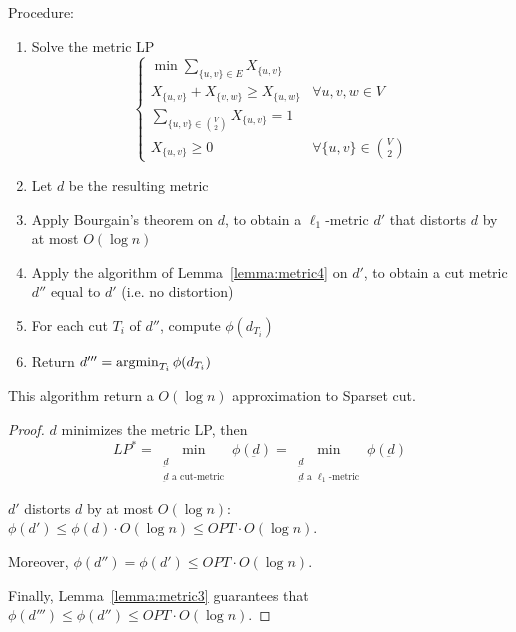     Procedure:
    \begin{enumerate}
        \item Solve the metric LP
        \begin{equation}
            \begin{cases}
                \min \sum_{\{u,v\} \in E} X_{\{u,v\}}\\
                X_{\{u,v\}} + X_{\{v,w\}} \geq X_{\{u,w\}}          & \forall u,v,w \in V\\
                \sum_{\{u,v\} \in \binom{V}{2}} X_{\{u,v\}} = 1\\
                X_{\{u,v\}} \geq 0                                  & \forall \{u,v\} \in \binom{V}{2}
            \end{cases}
        \end{equation}
        \item Let $d$ be the resulting metric
        \item Apply Bourgain's theorem on $d$, to obtain a $\ell_1$-metric $d'$ that distorts $d$ by at most $O(\log n)$
        \item Apply the algorithm of Lemma~\ref{lemma:metric4} on $d'$, to obtain a cut metric $d''$ equal to $d'$ (i.e. no distortion)
        \item For each cut $T_i$ of $d''$, compute $\phi(d_{T_i})$
        \item Return $d''' = \operatorname*{argmin}_{T_i} \phi(d_{T_i})$
    \end{enumerate}

    \begin{theorem}
        This algorithm return a $O(\log n)$ approximation to Sparset cut.
    \end{theorem}

    \begin{proof}
        $d$ minimizes the metric LP, then 
        \[ LP^* = \min_{\substack{\underbar{d}\\ \underbar{d} \text{ a cut-metric}}} \phi(\underbar{d}) = \min_{\substack{\underbar{d}\\ \underbar{d} \text{ a } \ell_1 \text{-metric}}} \phi(\underbar{d}) \]

        $d'$ distorts $d$ by at most $O(\log n)$: $\phi(d') \leq \phi(d) \cdot O(\log n) \leq OPT \cdot O(\log n)$.

        Moreover, $\phi(d'') = \phi(d') \leq OPT \cdot O(\log n)$.

        Finally, Lemma~\ref{lemma:metric3} guarantees that $\phi(d''') \leq \phi(d'') \leq OPT \cdot O(\log n)$.
    \end{proof}

